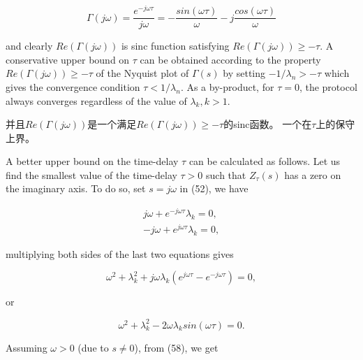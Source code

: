 \documentclass{article}
\begin{document}
\begin{equation}
    \tag{55}
    \label{55}
    \Gamma(j\omega) = \frac{e^{-j\omega\tau}}{j\omega} = -\frac{sin(\omega\tau)}{\omega} -j\frac{cos(\omega\tau)}{\omega}
\end{equation}

{\color[gray]{0.5}
\noindent and clearly $Re(\Gamma(j\omega))$ is sinc function satisfying $Re(\Gamma(j\omega)) \ge -\tau$. 
A conservative upper bound on $\tau$ can be obtained according to the property $Re(\Gamma(j\omega)) \ge -\tau$ of the Nyquist plot of $\Gamma(s)$ by setting $-1/\lambda_n > -\tau$ which gives the convergence condition $\tau < 1/\lambda_n$. 
As a by-product, for $\tau=0$, the protocol always converges regardless of the value of $\lambda_k, k>1$. 
}

\noindent 并且$Re(\Gamma(j\omega))$是一个满足$Re(\Gamma(j\omega)) \ge -\tau$的sinc函数。
一个在$\tau$上的保守上界。

{\color[gray]{0.5}
A better upper bound on the time-delay $\tau$ can be calculated as follows. 
Let us find the smallest value of the time-delay $\tau>0$ such that $Z_{\tau}(s)$ has a zero on the imaginary axis. 
To do so, set $s=j\omega$ in (52), we have
}



\begin{equation}
    \tag{56}
    \label{56}
    \begin{aligned}
        j\omega + e^{-j\omega\tau} \lambda_k = 0,\\
        -j\omega + e^{j\omega\tau} \lambda_k = 0,
    \end{aligned}
\end{equation}

{\color[gray]{0.5}
\noindent multiplying both sides of the last two equations gives
}



\begin{equation}
    \tag{57}
    \label{57}
    \omega^2 + \lambda_k^2 + j\omega\lambda_k(e^{j\omega\tau}-e^{-j\omega\tau})=0,
\end{equation}

{\color[gray]{0.5}
\noindent or
}



\begin{equation}
    \tag{58}
    \label{58}
    \omega^2 + \lambda_k^2 - 2\omega\lambda_k sin(\omega\tau)=0.
\end{equation}

{\color[gray]{0.5}
\noindent Assuming $\omega>0$ (due to $s\ne 0$), from (58), we get
}
\end{document}
